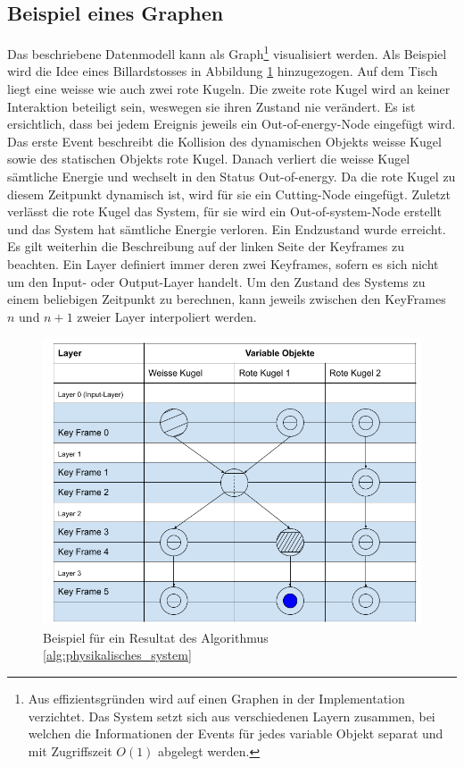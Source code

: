 \subsection{Beispiel eines Graphen}
Das beschriebene Datenmodell kann als Graph\footnote{Aus effizientsgründen wird auf einen Graphen in der Implementation
verzichtet. Das System setzt sich aus verschiedenen Layern zusammen, bei welchen die Informationen der Events für jedes
variable Objekt separat und mit Zugriffszeit $O(1)$ abgelegt werden.} visualisiert werden. Als Beispiel wird die Idee
eines Billardstosses in Abbildung \ref{fig:Beispiel für ein Resultat des Algorithmus phys_sys} hinzugezogen.
Auf dem Tisch liegt eine weisse wie auch zwei rote Kugeln. Die zweite rote Kugel wird an keiner Interaktion beteiligt sein,
weswegen sie ihren Zustand nie verändert. Es ist ersichtlich, dass bei jedem Ereignis jeweils ein \glqq Out-of-energy-Node\grqq{}
eingefügt wird. Das erste Event beschreibt die Kollision des dynamischen Objekts \glqq weisse Kugel\grqq{} sowie des
statischen Objekts \glqq rote Kugel\grqq{}. Danach verliert die weisse Kugel sämtliche Energie und wechselt in den
Status \glqq{} Out-of-energy\grqq{}. Da die rote Kugel zu diesem Zeitpunkt dynamisch ist, wird für sie ein
\glqq{} Cutting-Node\grqq{} eingefügt. Zuletzt verlässt die rote Kugel das System, für sie wird ein \glqq{} Out-of-system-Node\grqq{}
erstellt und das System hat sämtliche Energie verloren. Ein Endzustand wurde erreicht. Es gilt weiterhin die Beschreibung
auf der linken Seite der Keyframes zu beachten. Ein Layer definiert immer deren zwei Keyframes, sofern es sich nicht um
den Input- oder Output-Layer handelt. Um den Zustand des Systems zu einem beliebigen Zeitpunkt zu berechnen, kann
jeweils zwischen den KeyFrames $n$ und $n + 1$ zweier Layer interpoliert werden.
\begin{figure}[h!]
    \begin{center}
        \includegraphics[width=0.6\linewidth]{../common/03_billiard_ai/resources/10_datenmodell_beispiel.png}
    \end{center}
    \caption{Beispiel für ein Resultat des Algorithmus \ref{alg:physikalisches_system}}
    \label{fig:Beispiel für ein Resultat des Algorithmus phys_sys}
\end{figure}

